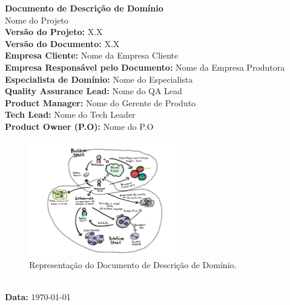 \begin{titlepage}
    \centering
    \vfill
    {\Huge \textbf{Documento de Descrição de Domínio}}\\[1.5cm]
    {\Large Nome do Projeto}\\[1cm]
    \textbf{Versão do Projeto:} X.X\\
    \textbf{Versão do Documento:} X.X\\[1cm]
    \textbf{Empresa Cliente:} Nome da Empresa Cliente\\
    \textbf{Empresa Responsável pelo Documento:} Nome da Empresa Produtora\\[1cm]
    \textbf{Especialista de Domínio:} Nome do Especialista\\
    \textbf{Quality Assurance Lead:} Nome do QA Lead\\
    \textbf{Product Manager:} Nome do Gerente de Produto\\
    \textbf{Tech Lead:} Nome do Tech Leader\\
    \textbf{Product Owner (P.O):} Nome do P.O\\[2cm]
    \begin{figure}[h]
        \centering
        \includegraphics[width=0.6\textwidth]{images/ddd.jpeg}
        \caption{Representação do Documento de Descrição de Domínio.}
        \label{fig:ddd_representacao}
    \end{figure}\\[1cm]
    \textbf{Data:} \today\\
    \vfill
\end{titlepage}

